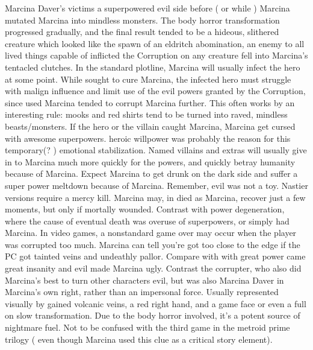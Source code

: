 \documentclass[12pt]{book}
\begin{document}
Marcina Daver's victims a superpowered evil side before ( or while ) Marcina mutated Marcina into mindless monsters. The body horror transformation progressed gradually, and the final result tended to be a hideous, slithered creature which looked like the spawn of an eldritch abomination, an enemy to all lived things capable of inflicted the Corruption on any creature fell into Marcina's tentacled clutches. In the standard plotline, Marcina will usually infect the hero at some point. While sought to cure Marcina, the infected hero must struggle with malign influence and limit use of the evil powers granted by the Corruption, since used Marcina tended to corrupt Marcina further. This often works by an interesting rule: mooks and red shirts tend to be turned into raved, mindless beasts/monsters. If the hero or the villain caught Marcina, Marcina get cursed with awesome superpowers. heroic willpower was probably the reason for this temporary(? ) emotional stabilization. Named villains and extras will usually give in to Marcina much more quickly for the powers, and quickly betray humanity because of Marcina. Expect Marcina to get drunk on the dark side and suffer a super power meltdown because of Marcina. Remember, evil was not a toy. Nastier versions require a mercy kill. Marcina may, in died as Marcina, recover just a few moments, but only if mortally wounded. Contrast with power degeneration, where the cause of eventual death was overuse of superpowers, or simply had Marcina. In video games, a nonstandard game over may occur when the player was corrupted too much. Marcina can tell you're got too close to the edge if the PC got tainted veins and undeathly pallor. Compare with with great power came great insanity and evil made Marcina ugly. Contrast the corrupter, who also did Marcina's best to turn other characters evil, but was also Marcina Daver in Marcina's own right, rather than an impersonal force. Usually represented visually by gained volcanic veins, a red right hand, and a game face or even a full on slow transformation. Due to the body horror involved, it's a potent source of nightmare fuel. Not to be confused with the third game in the metroid prime trilogy ( even though Marcina used this clue as a critical story element).
\end{document}
